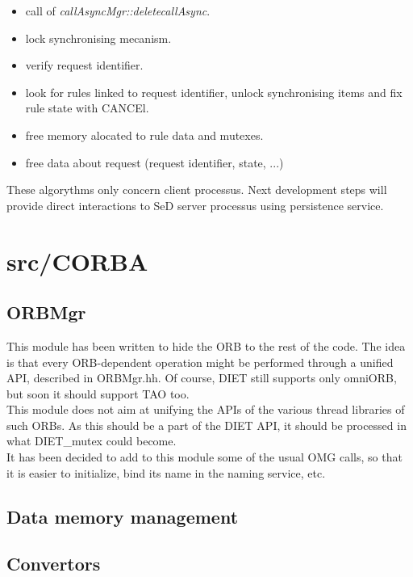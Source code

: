   \begin{itemize}
  \item call of \emph{callAsyncMgr::deletecallAsync}.
  \item lock synchronising mecanism.
  \item verify request identifier.
  \item look for rules linked to request identifier,
  unlock synchronising items and fix rule state with CANCEl.
  \item free memory alocated to rule data and mutexes.
\item free data about request (request identifier, state, ...)
  \end{itemize}

  \noindent
   These algorythms only concern client processus. Next development steps
  will provide direct interactions to SeD server processus using persistence
  service.

  \section{\textsf{src/CORBA}}
  \label{s:CORBA}

  \subsection{\textsf{ORBMgr}}

  This module has been written to hide the ORB to the rest of the code. The idea
  is that every ORB-dependent operation might be performed through a unified API,
  described in \textsf{ORBMgr.hh}. Of course, DIET still supports only omniORB,
  but soon it should support TAO too.
  \\
  This module does not aim at unifying the APIs of the various thread libraries of
  such ORBs. As this should be a part of the DIET API, it should be processed in
  what \textsf{DIET\_mutex} could become.
  \\
  It has been decided to add to this module some of the usual OMG calls, so that
  it is easier to initialize, bind its name in the naming service, etc.


  \subsection{Data memory management}



  \subsection{Convertors}

